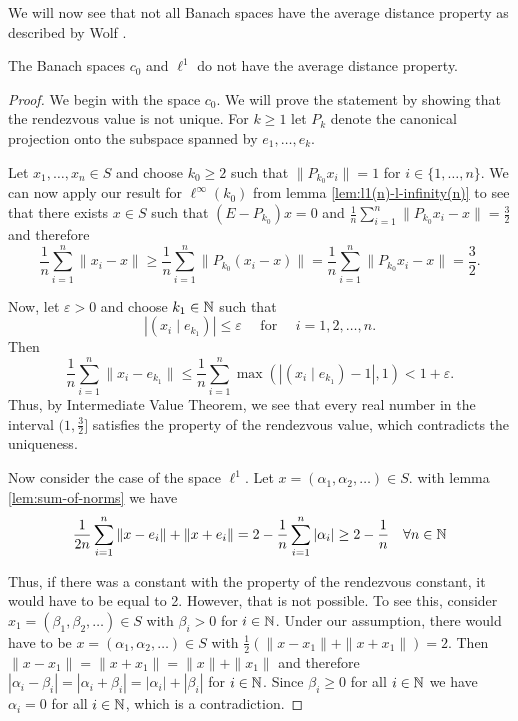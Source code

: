 We will now see that not all Banach spaces have the average distance property as described by Wolf \cite{wolf:spheres}.
\begin{theorem}
	The Banach spaces $c_0$ and $\ell^1$ do not have the average distance property.
\end{theorem}

\begin{proof}
	We begin with the space $c_0$. We will prove the statement by showing that the rendezvous value is not unique. For $k\geq 1$ let $P_k$ denote the canonical projection onto the subspace spanned by $e_1,\dots,e_k$.
	
	Let $x_1,\dots,x_n\in S$ and choose $k_0\geq 2$ such that $\|P_{k_0}x_i\|=1$ for $i\in \{1,\dots,n\}$. We can now apply our result for $\ell^\infty(k_0)$ from lemma \ref{lem:l1(n)-l-infinity(n)} to see that there exists $x\in S$ such that $(E-P_{k_0})x=0$ 
	 and $\frac{1}{n}\sum_{i=1}^{n}\|P_{k_0}x_i-x\|=\frac{3}{2}$ and therefore
	 \[
	 \frac{1}{n}\sum_{i=1}^n\|x_i-x\|\geq \frac{1}{n}\sum_{i=1}^n\|P_{k_0}(x_i-x)\|=\frac{1}{n}\sum_{i=1}^n\|P_{k_0}x_i-x\|=\frac{3}{2}.
	 \]
	 
	 Now, let $\varepsilon>0$ and choose $k_1\in \mathbb{N}$ such that
	 \[
	 |(x_i\mid e_{k_1})|\leq \varepsilon\quad \text{ for }\quad i=1,2,\dots, n.
	 \]
	 Then 
	\[
	\frac{1}{n}\sum_{i=1}^n\|x_i-e_{k_1}\|\leq \frac{1}{n}\sum_{i=1}^n\max(|(x_i\mid e_{k_1})-1|,1)<1+\varepsilon.
	\]
	Thus, by Intermediate Value Theorem, we see that every real number in the interval $(1,\frac{3}{2}]$ satisfies the property of the rendezvous value, which contradicts the uniqueness.
	
	Now consider the case of the space $\ell^1$. Let $x=(\alpha_1,\alpha_2,\dots)\in S$. with lemma \ref{lem:sum-of-norms} we have
	\[
	\frac{1}{2n}\sum_{i=1}^n \|x-e_i\|+\|x+e_i\|=2-\frac{1}{n}\sum_{i=1}^n|\alpha_i|\geq 2-\frac{1}{n} \quad \forall n\in \mathbb{N}
	\] 
	
	Thus, if there was a constant with the property of the rendezvous constant, it would have to be equal to 2. However, that is not possible. To see this, consider $x_1=(\beta_1,\beta_2,\dots)\in S$ with $\beta_i>0$ for $i\in \mathbb{N}$. Under our assumption, there would have to be $x=(\alpha_1,\alpha_2,\dots)\in S$ with $\frac{1}{2}(\|x-x_1\|+\|x+x_1\|)=2$. Then $\|x-x_1\|=\|x+x_1\|=\|x\|+\|x_1\|$ and therefore $|\alpha_i-\beta_i|=|\alpha_i+\beta_i|=|\alpha_i|+|\beta_i|$ for $i\in \mathbb{N}$. Since $\beta_i\geq 0$ for all $i\in \mathbb{N}$ we have $\alpha_i=0$ for all $i\in \mathbb{N}$, which is a contradiction.
\end{proof}

